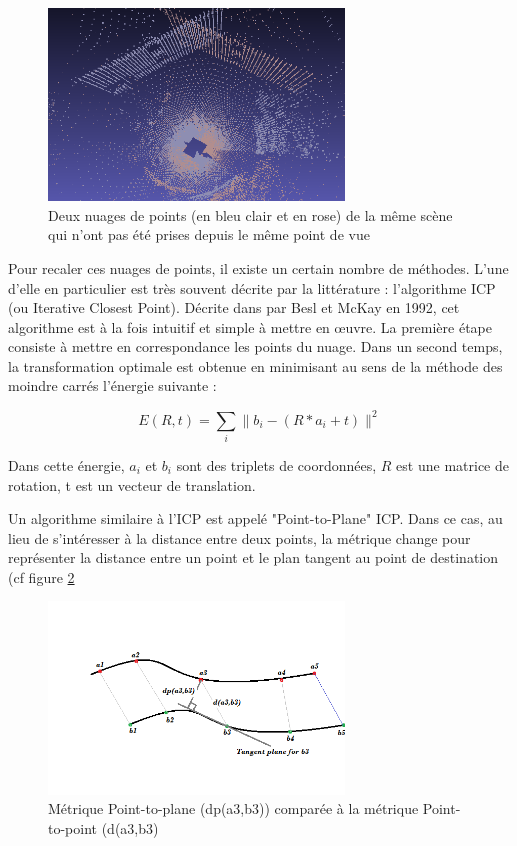 \begin{figure}[H]
\centering
\includegraphics[width = 0.7\textwidth]{Images/Resume/nuage_recalage}
\caption{Deux nuages de points (en bleu clair et en rose) de la même scène qui n'ont pas été prises depuis le même point de vue}
\label{fig_nuage_recalage}
\end{figure}

Pour recaler ces nuages de points, il existe un certain nombre de méthodes. L'une d'elle en particulier est très souvent décrite par la littérature : l'algorithme ICP (ou Iterative Closest Point). Décrite dans \cite{bib_icp} par Besl et McKay en 1992, cet algorithme est à la fois intuitif et simple à mettre en œuvre. La première étape consiste à mettre en correspondance les points du nuage. Dans un second temps, la transformation optimale est obtenue en minimisant au sens de la méthode des moindre carrés l'énergie suivante :

\begin{equation}
E(R,t) = \sum_{i}\|b_{i}-(R*a_{i} + t)\|^{2}
\end{equation}

Dans cette énergie, $a_{i}$ et $b_{i}$ sont des triplets de coordonnées, $R$ est une matrice de rotation, t est un vecteur de translation.

Un algorithme similaire à l'ICP est appelé "Point-to-Plane" ICP. Dans ce cas, au lieu de s'intéresser à la distance entre deux points, la métrique change pour représenter la distance entre un point et le plan tangent au point de destination (cf figure \ref{fig_pointtoplane}

\begin{figure}[H]
\centering
\includegraphics[width = 0.7\textwidth]{Images/Resume/icp_pointplan}
\caption{Métrique Point-to-plane (dp(a3,b3)) comparée à la métrique Point-to-point (d(a3,b3)}
\label{fig_pointtoplane}
\end{figure}

